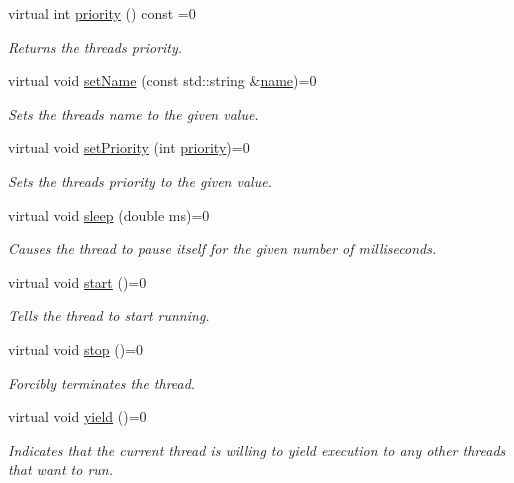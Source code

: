 \begin{DoxyCompactItemize}
virtual int \mbox{\hyperlink{classGThread_afefd48fe4270e6c5f2ec4c129080bfde}{priority}} () const =0
\begin{DoxyCompactList}\small\item\em Returns the thread\textquotesingle{}s priority. \end{DoxyCompactList}\item 
virtual void \mbox{\hyperlink{classGThread_aa384b56425e77d3a0ea434eed3f37b53}{set\+Name}} (const std\+::string \&\mbox{\hyperlink{classGThread_a7f04e718c6856c4d3d77a496b6acad0d}{name}})=0
\begin{DoxyCompactList}\small\item\em Sets the thread\textquotesingle{}s name to the given value. \end{DoxyCompactList}\item 
virtual void \mbox{\hyperlink{classGThread_aa64e7a844400aed800a4f223da0d03d8}{set\+Priority}} (int \mbox{\hyperlink{classGThread_afefd48fe4270e6c5f2ec4c129080bfde}{priority}})=0
\begin{DoxyCompactList}\small\item\em Sets the thread\textquotesingle{}s priority to the given value. \end{DoxyCompactList}\item 
virtual void \mbox{\hyperlink{classGThread_aa766a832061596446daffb891f42b71d}{sleep}} (double ms)=0
\begin{DoxyCompactList}\small\item\em Causes the thread to pause itself for the given number of milliseconds. \end{DoxyCompactList}\item 
virtual void \mbox{\hyperlink{classGThread_ac0ae5f26cd2001d772aed9d2ea97d41c}{start}} ()=0
\begin{DoxyCompactList}\small\item\em Tells the thread to start running. \end{DoxyCompactList}\item 
virtual void \mbox{\hyperlink{classGThread_a0efff8623a2fb79dad94a96dcf16d966}{stop}} ()=0
\begin{DoxyCompactList}\small\item\em Forcibly terminates the thread. \end{DoxyCompactList}\item 
virtual void \mbox{\hyperlink{classGThread_a77a5c1943920f355bd1db8cb99bddcfc}{yield}} ()=0
\begin{DoxyCompactList}\small\item\em Indicates that the current thread is willing to yield execution to any other threads that want to run. \end{DoxyCompactList}\end{DoxyCompactItemize}

